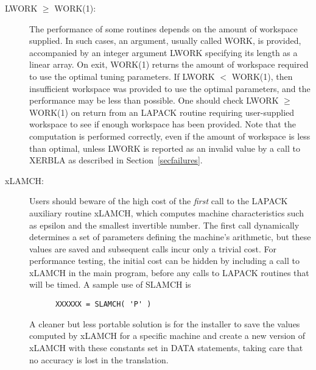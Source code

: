 \begin{description}
\item[LWORK $\geq$ WORK(1):]
The performance of some routines depends on the amount of workspace
supplied. In such cases,
an argument, usually called WORK, is
provided, accompanied by an integer argument LWORK specifying its
length as a linear array. 
On exit, WORK(1) returns the amount of workspace required to use
the optimal tuning parameters.
If LWORK $<$ WORK(1), then insufficient workspace was provided
to use the optimal parameters, and the performance may be less
than possible.
One should check LWORK $\geq$ WORK(1) on return from
an LAPACK routine requiring user-supplied workspace to see if
enough workspace has been provided.
Note that the computation is performed correctly, even if the amount of
workspace is less than optimal, unless LWORK is reported as an
invalid value by a call to XERBLA as described in Section~\ref{secfailures}.

\item[xLAMCH:] Users should beware of the high cost of the {\em first}
call to the LAPACK auxiliary routine xLAMCH,
which computes
machine characteristics such as epsilon and the
smallest invertible number.
The first call dynamically determines a set of parameters defining
the machine's arithmetic, but these values are saved and subsequent
calls incur only a trivial cost.
For performance testing, the initial cost can be hidden by 
including a call to xLAMCH in the main program, before any calls to
LAPACK routines that will be timed.  A sample use of SLAMCH is
\begin{verbatim}
      XXXXXX = SLAMCH( 'P' )
\end{verbatim}
A cleaner but less portable solution is for the installer to
save the values computed by xLAMCH for a specific machine
and create a new version of xLAMCH with these constants set in
DATA statements, taking care that no accuracy is lost in the
translation.
\end{description}

